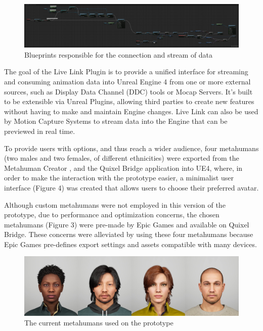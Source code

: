 \begin{figure}[h!]
\includegraphics[width=\textwidth]{figures/hereItBegins.png}
\centering
\caption{Blueprints responsible for the connection and stream of data}
\end{figure}

The goal of the Live Link Plugin \cite{EPI22} is to provide a unified interface for streaming and consuming animation data into Unreal Engine 4 from one or more external sources, such as Display Data Channel (DDC) tools or Mocap Servers. It's built to be extensible via Unreal Plugins, allowing third parties to create new features without having to make and maintain Engine changes. Live Link can also be used by Motion Capture Systems to stream data into the Engine that can be previewed in real time.

To provide users with options, and thus reach a wider audience, four metahumans (two males and two females, of different ethnicities) were exported from the Metahuman Creator \cite{EPI21}, and the Quixel Bridge application into UE4, where, in order to make the interaction with the prototype easier, a minimalist user interface (Figure 4) was created that allows users to choose their preferred avatar. 

Although custom metahumans were not employed in this version of the prototype, due to performance and optimization concerns, the chosen metahumans (Figure 3) were pre-made by Epic Games and available on Quixel Bridge. These concerns were alleviated by using these four metahumans because Epic Games pre-defines export settings and assets compatible with many devices.

\begin{figure}[h!]
\includegraphics[width=\textwidth]{figures/4metahumans.jpg}
\centering
\caption{The current metahumans used on the prototype}
\end{figure}


